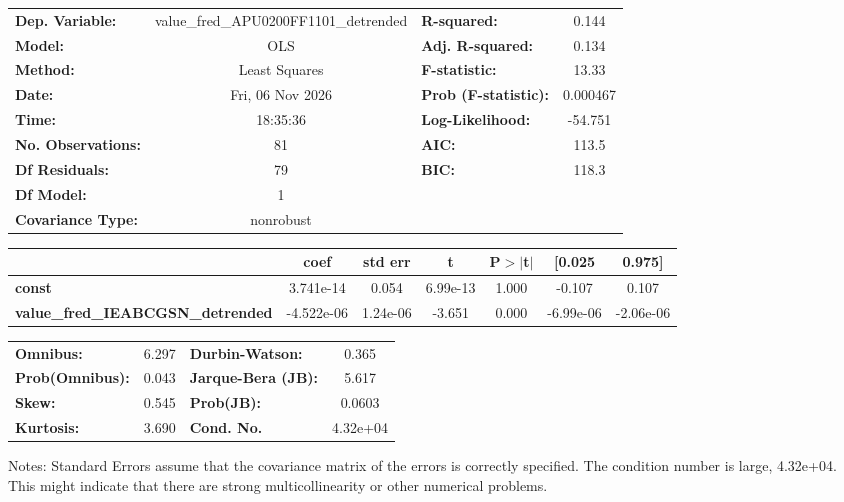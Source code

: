 \begin{center}
\begin{tabular}{lclc}
\toprule
\textbf{Dep. Variable:}                   & value\_fred\_APU0200FF1101\_detrended & \textbf{  R-squared:         } &     0.144   \\
\textbf{Model:}                           &                  OLS                  & \textbf{  Adj. R-squared:    } &     0.134   \\
\textbf{Method:}                          &             Least Squares             & \textbf{  F-statistic:       } &     13.33   \\
\textbf{Date:}                            &            Fri, 06 Nov 2026           & \textbf{  Prob (F-statistic):} &  0.000467   \\
\textbf{Time:}                            &                18:35:36               & \textbf{  Log-Likelihood:    } &   -54.751   \\
\textbf{No. Observations:}                &                     81                & \textbf{  AIC:               } &     113.5   \\
\textbf{Df Residuals:}                    &                     79                & \textbf{  BIC:               } &     118.3   \\
\textbf{Df Model:}                        &                      1                & \textbf{                     } &             \\
\textbf{Covariance Type:}                 &               nonrobust               & \textbf{                     } &             \\
\bottomrule
\end{tabular}
\begin{tabular}{lcccccc}
                                          & \textbf{coef} & \textbf{std err} & \textbf{t} & \textbf{P$> |$t$|$} & \textbf{[0.025} & \textbf{0.975]}  \\
\midrule
\textbf{const}                            &    3.741e-14  &        0.054     &  6.99e-13  &         1.000        &       -0.107    &        0.107     \\
\textbf{value\_fred\_IEABCGSN\_detrended} &   -4.522e-06  &     1.24e-06     &    -3.651  &         0.000        &    -6.99e-06    &    -2.06e-06     \\
\bottomrule
\end{tabular}
\begin{tabular}{lclc}
\textbf{Omnibus:}       &  6.297 & \textbf{  Durbin-Watson:     } &    0.365  \\
\textbf{Prob(Omnibus):} &  0.043 & \textbf{  Jarque-Bera (JB):  } &    5.617  \\
\textbf{Skew:}          &  0.545 & \textbf{  Prob(JB):          } &   0.0603  \\
\textbf{Kurtosis:}      &  3.690 & \textbf{  Cond. No.          } & 4.32e+04  \\
\bottomrule
\end{tabular}
\end{center}

Notes: \newline
 [1] Standard Errors assume that the covariance matrix of the errors is correctly specified. \newline
 [2] The condition number is large, 4.32e+04. This might indicate that there are \newline
 strong multicollinearity or other numerical problems.